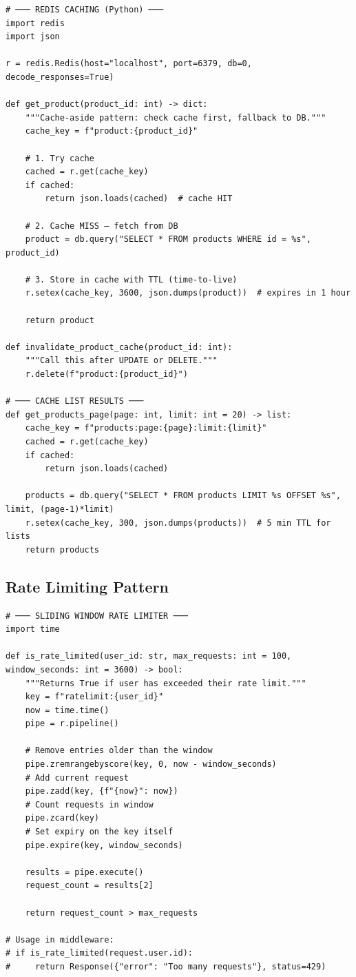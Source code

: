 \documentclass[10pt, a4paper]{article}
\begin{document}
\begin{lstlisting}[language=mypython]
# ─── REDIS CACHING (Python) ───
import redis
import json

r = redis.Redis(host="localhost", port=6379, db=0, decode_responses=True)

def get_product(product_id: int) -> dict:
    """Cache-aside pattern: check cache first, fallback to DB."""
    cache_key = f"product:{product_id}"
    
    # 1. Try cache
    cached = r.get(cache_key)
    if cached:
        return json.loads(cached)  # cache HIT
    
    # 2. Cache MISS — fetch from DB
    product = db.query("SELECT * FROM products WHERE id = %s", product_id)
    
    # 3. Store in cache with TTL (time-to-live)
    r.setex(cache_key, 3600, json.dumps(product))  # expires in 1 hour
    
    return product

def invalidate_product_cache(product_id: int):
    """Call this after UPDATE or DELETE."""
    r.delete(f"product:{product_id}")

# ─── CACHE LIST RESULTS ───
def get_products_page(page: int, limit: int = 20) -> list:
    cache_key = f"products:page:{page}:limit:{limit}"
    cached = r.get(cache_key)
    if cached:
        return json.loads(cached)
    
    products = db.query("SELECT * FROM products LIMIT %s OFFSET %s", limit, (page-1)*limit)
    r.setex(cache_key, 300, json.dumps(products))  # 5 min TTL for lists
    return products
\end{lstlisting}


\subsection{Rate Limiting Pattern}


\begin{lstlisting}[language=mypython]
# ─── SLIDING WINDOW RATE LIMITER ───
import time

def is_rate_limited(user_id: str, max_requests: int = 100, window_seconds: int = 3600) -> bool:
    """Returns True if user has exceeded their rate limit."""
    key = f"ratelimit:{user_id}"
    now = time.time()
    pipe = r.pipeline()
    
    # Remove entries older than the window
    pipe.zremrangebyscore(key, 0, now - window_seconds)
    # Add current request
    pipe.zadd(key, {f"{now}": now})
    # Count requests in window
    pipe.zcard(key)
    # Set expiry on the key itself
    pipe.expire(key, window_seconds)
    
    results = pipe.execute()
    request_count = results[2]
    
    return request_count > max_requests

# Usage in middleware:
# if is_rate_limited(request.user.id):
#     return Response({"error": "Too many requests"}, status=429)
\end{lstlisting}
\end{document}

